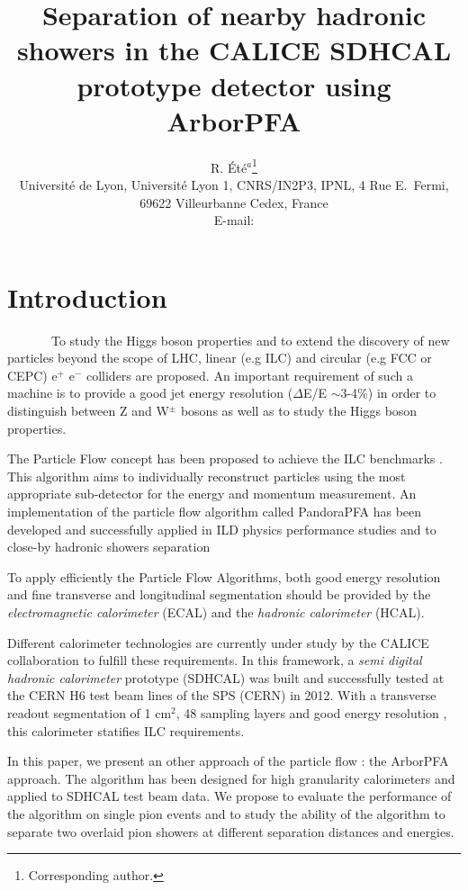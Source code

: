 \documentclass[cits]{JINST}
\title{Separation of nearby hadronic showers in the CALICE SDHCAL prototype detector using ArborPFA}
\author{R. \'Et\'e$^a$\thanks{Corresponding author.} \\%
\llap{$^a$} Universit\'e de Lyon, Universit\'e Lyon 1, CNRS/IN2P3, 
 IPNL, 4 Rue E.~Fermi, 69622 Villeurbanne Cedex, France\\
 
 
 E-mail: \email{rete@ipnl.in2p3.fr}
 }
\begin{document}

\newpage
\section{Introduction}

~~~~~~~To study the Higgs boson properties and to extend the discovery of new particles beyond the scope of LHC, linear (e.g ILC) and circular (e.g FCC or CEPC) e$^+$ e$^-$ colliders are proposed. An important requirement of such a machine is to provide a good jet energy resolution ($\Delta$E/E $\sim$3-4\%) in order to distinguish between Z and W$^{\pm}$ bosons as well as to study the Higgs boson properties.

The Particle Flow concept has been proposed to achieve the ILC benchmarks \cite{ilc-tdr}. This algorithm aims to individually reconstruct particles using the most appropriate sub-detector for the energy and momentum measurement. An implementation of the particle flow algorithm called PandoraPFA has been developed \cite{pandora-pfa} and successfully applied in ILD physics performance studies and to close-by hadronic showers separation%

To apply efficiently the Particle Flow Algorithms, both good energy resolution and fine transverse and longitudinal segmentation should be provided by the \textit{electromagnetic calorimeter} (ECAL) and the \textit{hadronic calorimeter} (HCAL).

Different calorimeter technologies are currently under study by the CALICE collaboration to fulfill these requirements. In this framework, a \textit{semi digital hadronic calorimeter} prototype (SDHCAL) was built \cite{sdhcal-paper} and successfully tested at the CERN H6 test beam lines of the SPS (CERN) in 2012. With a transverse readout segmentation of 1 cm$^2$, 48 sampling layers and good energy resolution \cite{sdhcal-paper}, this calorimeter statifies ILC requirements. 

In this paper, we present an other approach of the particle flow : the ArborPFA approach. The algorithm has been designed for high granularity calorimeters and applied to SDHCAL test beam data. We propose to evaluate the performance of the algorithm on single pion events and to study the ability of the algorithm to separate two overlaid pion showers at different separation distances and energies.
\end{document}
